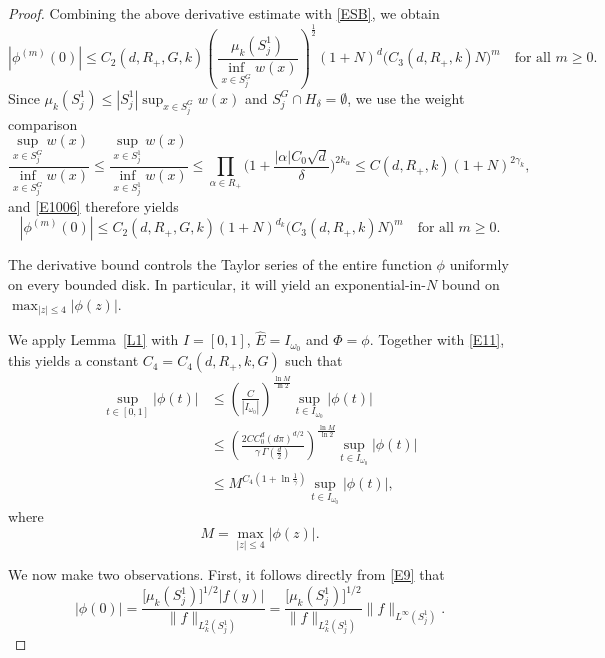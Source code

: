 \documentclass[12pt]{article}
\begin{document}
\begin{proof}
Combining the above derivative estimate with \eqref{ESB}, we obtain
\begin{equation}\label{E1006}
|\phi^{(m)}(0)| \leq C_2(d, R_+, G, k)(\frac{\mu_k(S_j^1)}{\inf_{x\in S_j^G}w(x)})^{\frac{1}{2}} (1 + N)^d \big( C_3(d, R_+, k) N \big)^m \quad \text{for all } m \geq 0.
\end{equation}
Since $\mu_k(S_j^1)\le |S_j^1|\sup_{x\in S_j^G}w(x)$ and $S_j^G\cap H_\delta=\emptyset$, we use the weight comparison
\[
\frac{\sup_{x\in S_j^G} w(x)}{\inf_{x\in S_j^G} w(x)} \le
\frac{\sup_{x\in S_j^1} w(x)}{\inf_{x\in S_j^1} w(x)} \le
\prod_{\alpha\in R_+} \biggl(1+\frac{|\alpha|C_0\sqrt{d}}{\delta}\biggr)^{2k_\alpha}\le C(d,R_+,k)(1+N)^{2\gamma_k},
\]
and \eqref{E1006} therefore yields
\begin{equation}\label{E16}
|\phi^{(m)}(0)| \leq C_2(d, R_+, G, k) (1 + N)^{d_k} \big( C_3(d, R_+, k) N \big)^m \quad \text{for all } m \geq 0.
\end{equation}


The derivative bound controls the Taylor series of the entire function $\phi$ uniformly on every bounded disk. In particular, it will yield an exponential-in-$N$ bound on $\max_{|z|\le4}|\phi(z)|$.

We apply Lemma~\ref{L1} with $I = [0,1]$, $\hat{E} = I_{\omega_0}$ and $\Phi = \phi$. Together with \eqref{E11}, this yields a constant $C_4 = C_4(d, R_+,k,G)$ such that
\begin{equation}\label{E12}
\begin{aligned}
\sup_{t\in[0,1]} |\phi(t)| &\leq \left(\frac{C}{|I_{\omega_0}|}\right)^{\frac{\ln M}{\ln 2}} \sup_{t\in I_{\omega_0}} |\phi(t)| \\
&\leq \left( \frac{2 C C_0^d (d \pi)^{d/2}}{\gamma \, \Gamma\left(\frac{d}{2}\right)} \right)^{\frac{\ln M}{\ln 2}} \sup_{t\in I_{\omega_0}} |\phi(t)| \\
&\leq M^{C_4\left(1+\ln \frac{1}{\gamma}\right)} \sup_{t\in I_{\omega_0}} |\phi(t)|,
\end{aligned}
\end{equation}
where
\begin{equation}\label{E14}
M = \max_{|z|\leq 4} |\phi(z)|.
\end{equation}

We now make two observations. First, it follows directly from \eqref{E9} that
\[
|\phi(0)| = \frac{\big[\mu_k(S_j^1)\big]^{1/2} |f(y)|}{\| f \|_{L_k^2(S_j^1)}} = \frac{\big[\mu_k(S_j^1)\big]^{1/2}}{\| f \|_{L_k^2(S_j^1)}} \|f\|_{L^\infty(S_j^1)}.
\]


\end{proof}
\end{document}

